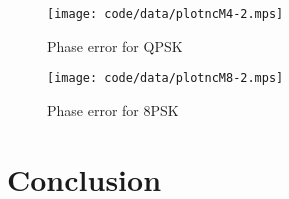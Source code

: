 \documentclass[journal]{IEEEtran}
\begin{document}


\begin{figure}[tp]
	\centering
		\texttt{[image: code/data/plotncM4-2.mps]}
		\caption{Phase error for QPSK}
		\label{fig:plotphase}
\end{figure}




\begin{figure}[tp]
	\centering
		\texttt{[image: code/data/plotncM8-2.mps]}
		\caption{Phase error for 8PSK}
		\label{fig:plotphase}
\end{figure}



\section{Conclusion}



\end{document}
